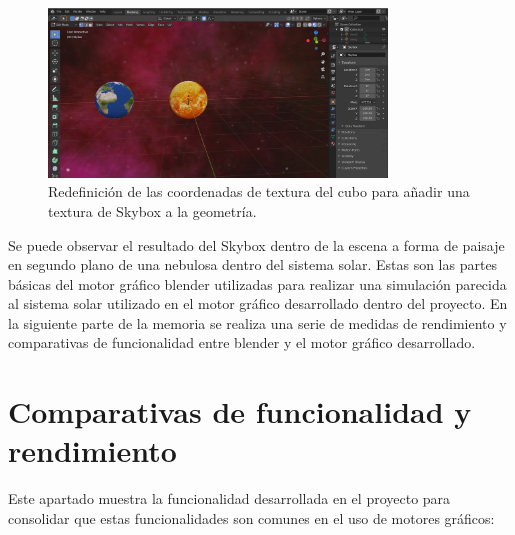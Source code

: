 \documentclass[a4paper]{book}
\begin{document}
\begin{figure}[H]
    \centering
    \includegraphics[width=9cm, keepaspectratio]{img/SkyBoxFinal.png}
    \caption{Redefinición de las coordenadas de textura del cubo para añadir una textura de Skybox a la geometría.}
    \label{SkyBoxFinal}
\end{figure}

Se puede observar el resultado del Skybox dentro de la escena a forma de paisaje en segundo plano de una nebulosa dentro
del sistema solar. Estas son las partes básicas del motor gráfico blender utilizadas para realizar una simulación parecida
al sistema solar utilizado en el motor gráfico desarrollado dentro del proyecto. En la siguiente parte de la memoria se realiza
una serie de medidas de rendimiento y comparativas de funcionalidad entre blender y el motor gráfico desarrollado.

\section{Comparativas de funcionalidad y rendimiento}
\label{sec:CompEngine}

Este apartado muestra la funcionalidad desarrollada en el proyecto para consolidar que estas funcionalidades son comunes en
el uso de motores gráficos:
\end{document}

